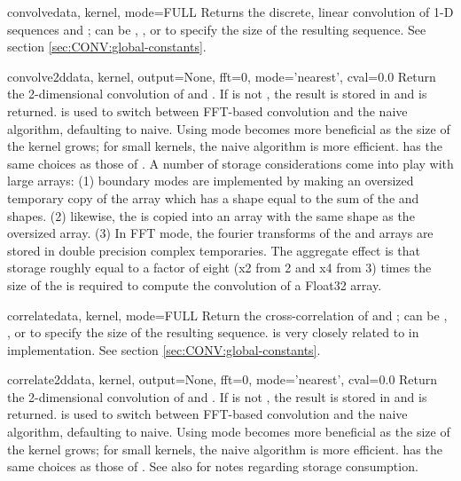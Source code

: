 \begin{funcdesc}{convolve}{data, kernel, mode=FULL}
   \label{func:CONV:convolve}
   Returns the discrete, linear convolution of 1-D sequences  
   and ;  can be , , 
   or  to specify the size of the resulting sequence.  See section
   \ref{sec:CONV:global-constants}.
\end{funcdesc}

\begin{funcdesc}{convolve2d}{data, kernel, output=None, fft=0, mode='nearest', 
    cval=0.0} Return the 2-dimensional convolution of  and
  .  If  is not , the result is
  stored in  and  is returned.   is
  used to switch between FFT-based convolution and the naive algorithm,
  defaulting to naive.  Using  mode becomes more beneficial as
  the size of the kernel grows; for small kernels, the naive algorithm is more
  efficient.   has the same choices as those of
  .  A number of storage considerations come into play with
  large arrays: (1) boundary modes are implemented by making an oversized
  temporary copy of the  array which has a shape equal to the
  sum of the  and  shapes.  (2) likewise, the
   is copied into an array with the same shape as the
  oversized  array.  (3) In FFT mode, the fourier transforms of
  the  and  arrays are stored in double
  precision complex temporaries. The aggregate effect is that storage roughly
  equal to a factor of eight (x2 from 2 and x4 from 3) times the size of the
   is required to compute the convolution of a Float32
   array.
\end{funcdesc}

\begin{funcdesc}{correlate}{data, kernel, mode=FULL}
   Return the cross-correlation of  and ;
    can be , , or  to 
   specify the size of the resulting sequence.   is
   very closely related to  in implementation.
   See section \ref{sec:CONV:global-constants}.
\end{funcdesc}

\begin{funcdesc}{correlate2d}{data, kernel, output=None, fft=0, mode='nearest', cval=0.0}
   \label{func:CONV:correlate2d}
  Return the 2-dimensional convolution of  and
  .  If  is not , the result is
  stored in  and  is returned.   is
  used to switch between FFT-based convolution and the naive algorithm,
  defaulting to naive.  Using  mode becomes more beneficial as
  the size of the kernel grows; for small kernels, the naive algorithm is more
  efficient.   has the same choices as those of
  .  See also  for notes regarding 
  storage consumption.
\end{funcdesc}

